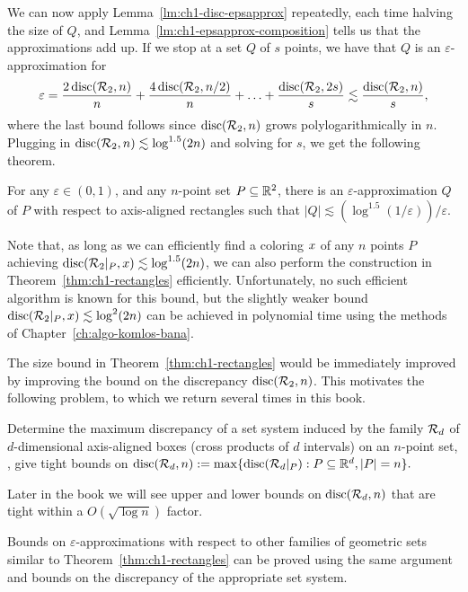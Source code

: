 We can now apply Lemma~\ref{lm:ch1-disc-epsapprox} repeatedly, each time halving the size of $Q$, and Lemma~\ref{lm:ch1-epsapprox-composition} tells us that the approximations add up. If we stop at a set $Q$ of $s$ points, we have that $Q$ is an $\varepsilon$-approximation for 
\[
\varepsilon = \frac{2 \operatorname{disc}(\mathcal{R}_2, n)}{n} + \frac{4 \operatorname{disc}(\mathcal{R}_2, n/2)}{n} + \ldots + \frac{\operatorname{disc}(\mathcal{R}_2, 2s)}{s}\lesssim \frac{\operatorname{disc}(\mathcal{R}_2, n)}{s},
\]
where the last bound follows since $\operatorname{disc}(\mathcal{R}_2, n)$ grows polylogarithmically in $n$. Plugging in $\operatorname{disc}(\mathcal{R}_2, n) \lesssim \log^{1.5}(2n)$ and solving for $s$, we get the following theorem.

\begin{theorem}\label{thm:ch1-rectangles}
     For any $\varepsilon \in (0,1)$, and any $n$-point set $P\subseteq \mathbb{R}^2$, there is an $\varepsilon$-approximation $Q$ of $P$ with respect to axis-aligned rectangles such that $|Q| \lesssim (\log^{1.5}(1/\varepsilon))/\varepsilon$.
\end{theorem}

Note that, as long as we can efficiently find a coloring $x$ of any $n$ points $P$ achieving $\operatorname{disc}(\mathcal{R}_2|_P,x) \lesssim \log^{1.5}(2n)$, we can also perform the construction in Theorem~\ref{thm:ch1-rectangles} efficiently. Unfortunately, no such efficient algorithm is known for this bound, but the slightly weaker bound $\operatorname{disc}(\mathcal{R}_2|_P,x) \lesssim \log^{2}(2n)$ can be achieved in polynomial time using the methods of Chapter~\ref{ch:algo-komlos-bana}.

The size bound in Theorem~\ref{thm:ch1-rectangles} would be immediately improved by improving the bound on the discrepancy $\operatorname{disc}(\mathcal{R}_2,n)$. This motivates the following problem, to which we return several times in this book.

\begin{problem}\label{prob:tusnady}
  Determine the maximum discrepancy of a set system induced by the family $\mathcal{R}_d$ of
  \(d\)-dimensional axis-aligned boxes (cross
products of $d$ intervals) on an \(n\)-point set, \ie,
  give tight bounds on 
  \(
    \operatorname{disc}(\mathcal{R}_d, n) := \max\{\operatorname{disc}(\mathcal{R}_d|_P): P \subseteq \mathbb{R}^d, |P| = n\}.
  \)
\end{problem}
Later in the book we will see upper and lower bounds on $\operatorname{disc}(\mathcal{R}_d, n)$ that are tight within a $O(\sqrt{\log n})$ factor.

Bounds on $\varepsilon$-approximations with respect to other families of geometric sets similar to Theorem~\ref{thm:ch1-rectangles} can be proved using the same argument and bounds on the discrepancy of the appropriate set system. 

